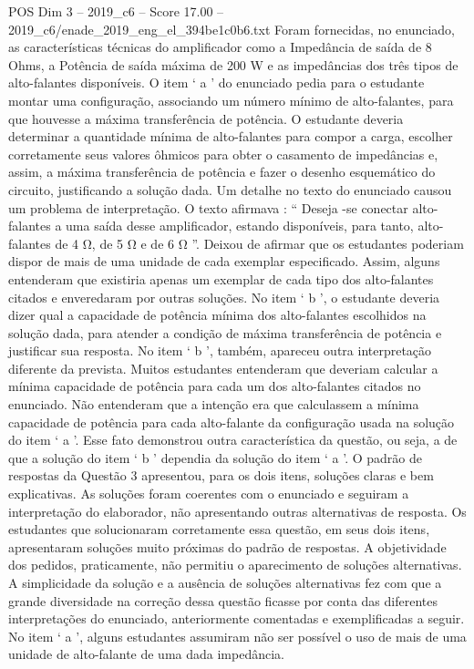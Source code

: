 \begin{textsample}{POS Dim 3 – 2019\_c6 – Score 17.00 – 2019\_c6/enade\_2019\_eng\_el\_394be1c0b6.txt}
Foram fornecidas, no enunciado, as características técnicas do amplificador como a Impedância de saída de 8 Ohms, a Potência de saída máxima de 200 W e as impedâncias dos três tipos de alto-falantes disponíveis.
O item ‘ a ’ do enunciado pedia para o estudante montar uma configuração, associando um número mínimo de alto-falantes, para que houvesse a máxima transferência de potência.
O estudante deveria determinar a quantidade mínima de alto-falantes para compor a carga, escolher corretamente seus valores ôhmicos para obter o casamento de impedâncias e, assim, a máxima transferência de potência e fazer o desenho esquemático do circuito, justificando a solução dada.
Um detalhe no texto do enunciado causou um problema de interpretação.
O texto afirmava : “ Deseja -se conectar alto-falantes a uma saída desse amplificador, estando disponíveis, para tanto, alto-falantes de 4 Ω, de 5 Ω e de 6 Ω ”.
Deixou de afirmar que os estudantes poderiam dispor de mais de uma unidade de cada exemplar especificado.
Assim, alguns entenderam que existiria apenas um exemplar de cada tipo dos alto-falantes citados e enveredaram por outras soluções.
No item ‘ b ’, o estudante deveria dizer qual a capacidade de potência mínima dos alto-falantes escolhidos na solução dada, para atender a condição de máxima transferência de potência e justificar sua resposta.
No item ‘ b ’, também, apareceu outra interpretação diferente da prevista.
Muitos estudantes entenderam que deveriam calcular a mínima capacidade de potência para cada um dos alto-falantes citados no enunciado.
Não entenderam que a intenção era que calculassem a mínima capacidade de potência para cada alto-falante da configuração usada na solução do item ‘ a ’.
Esse fato demonstrou outra característica da questão, ou seja, a de que a solução do item ‘ b ’ dependia da solução do item ‘ a ’.
O padrão de respostas da Questão 3 apresentou, para os dois itens, soluções claras e bem explicativas.
As soluções foram coerentes com o enunciado e seguiram a interpretação do elaborador, não apresentando outras alternativas de resposta.
Os estudantes que solucionaram corretamente essa questão, em seus dois itens, apresentaram soluções muito próximas do padrão de respostas.
A objetividade dos pedidos, praticamente, não permitiu o aparecimento de soluções alternativas.
A simplicidade da solução e a ausência de soluções alternativas fez com que a grande diversidade na correção dessa questão ficasse por conta das diferentes interpretações do enunciado, anteriormente comentadas e exemplificadas a seguir.
No item ‘ a ’, alguns estudantes assumiram não ser possível o uso de mais de uma unidade de alto-falante de uma dada impedância.

\end{textsample}
